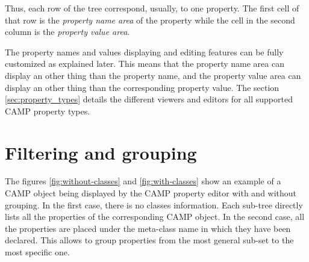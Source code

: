 \documentclass[a4paper, twoside]{report}
\begin{document}


Thus, each row of the tree correspond, usually, to one property. The first cell of that row is the
\emph{property name area} of the property while the cell in the second column is the \emph{property
value area}.

The property names and values displaying and editing features can be fully customized as explained
later. This means that the property name area can display an other thing than the property name, and
the property value area can display an other thing than the corresponding property value. The
section \ref{sec:property_types} details the different viewers and editors for all
supported CAMP property types.

\section{Filtering and grouping}


The figures \ref{fig:without-classes} and \ref{fig:with-classes} show an
example of a CAMP object being displayed by the CAMP property editor with and without grouping. In
the first case, there is no classes information. Each sub-tree directly lists all the properties of the
corresponding CAMP object. In the second case, all the properties are placed under the meta-class
name in which they have been declared. This allows to group properties from the most general sub-set to the
most specific one.
\end{document}
